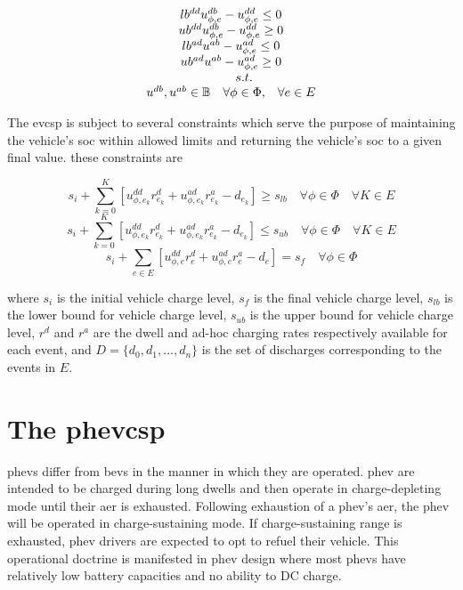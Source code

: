 \documentclass[12pt]{article}
\begin{document}
\begin{equation}
	\begin{array}{ccc}
		\multicolumn{3}{c}{lb^{dd}u_{\phi,e}^{db}-u_{\phi,e}^{dd}\leq 0}\\
		\multicolumn{3}{c}{ub^{dd}u_{\phi,e}^{db}-u_{\phi,e}^{dd}\geq 0}\\
		\multicolumn{3}{c}{lb^{ad}u^{ab}-u_{\phi,e}^{ad}\leq 0}\\
		\multicolumn{3}{c}{ub^{ad}u^{ab}-u_{\phi,e}^{ad}\geq 0}\\
		& s.t. & \\
		u^{db}, u^{ab}\in\mathbb{B} & \forall \phi\in \Phi,& \forall e\in E\\
	\end{array}
\end{equation}

The \gls{evcsp} is subject to several constraints which serve the purpose of maintaining the vehicle's \gls{soc} within allowed limits and returning the vehicle's \gls{soc} to a given final value. these constraints are

\begin{equation}
	s_i+\sum_{k=0}^{K}[u_{\phi,e_k}^{dd}r_{e_k}^{d}+u_{\phi,e_k}^{ad}r_{e_k}^{a}-d_{e_k}]\geq s_{lb}\quad \forall \phi\in \Phi\quad \forall K\in E
\end{equation}
\begin{equation}
	s_i+\sum_{k=0}^{K}[u_{\phi,e_k}^{dd}r_{e_k}^{d}+u_{\phi,e_k}^{ad}r_{e_k}^{a}-d_{e_k}]\leq s_{ub}\quad \forall \phi\in \Phi\quad \forall K\in E
\end{equation}
\begin{equation}
	s_i+\sum_{e\in E}[u_{\phi,e}^{dd}r_{e}^{d}+u_{\phi,e}^{ad}r_{e}^{a}-d_{e}]=s_f\quad \forall \phi\in \Phi
\end{equation}

where $s_i$ is the initial vehicle charge level, $s_f$ is the final vehicle charge level, $s_{lb}$ is the lower bound for vehicle charge level, $s_{ub}$ is the upper bound for vehicle charge level, $r^d$ and $r^a$ are the dwell and ad-hoc charging rates respectively available for each event, and $D=\{d_0,d_1,\dots,d_n\}$ is the set of discharges corresponding to the events in $E$.

\section*{The \gls{phevcsp}}

\glspl{phev} differ from \glspl{bev} in the manner in which they are operated. \gls{phev} are intended to be charged during long dwells and then operate in charge-depleting mode until their \gls{aer} is exhausted. Following exhaustion of a \gls{phev}'s \gls{aer}, the \gls{phev} will be operated in charge-sustaining mode. If charge-sustaining range is exhausted, \gls{phev} drivers are expected to opt to refuel their vehicle. This operational doctrine is manifested in \gls{phev} design where most \glspl{phev} have relatively low battery capacities and no ability to DC charge.
\end{document}
